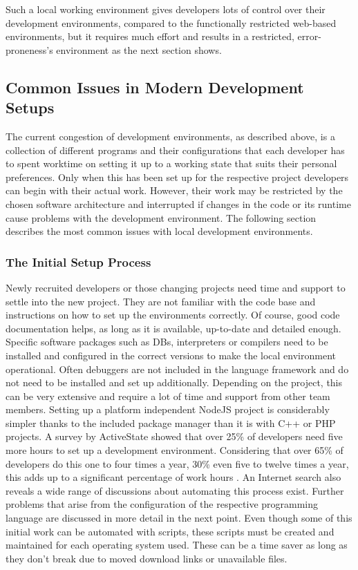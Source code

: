 \documentclass[12pt, a4paper]{article}
\begin{document}
    Such a local working environment gives developers lots of control over their development environments, compared to the functionally restricted web-based environments, but it requires much effort and results in a restricted, error-proneness's environment as the next section shows.

    \subsection{Common Issues in Modern Development Setups}
    The current congestion of development environments, as described above, is a collection of different programs and their configurations that each developer has to spent worktime on setting it up to a working state that suits their personal preferences. Only when this has been set up for the respective project developers can begin with their actual work. However, their work may be restricted by the chosen software architecture and interrupted if changes in the code or its runtime cause problems with the development environment. The following section describes the most common issues with local development environments.

        \subsubsection{The Initial Setup Process}\label{sss::initial}
        Newly recruited developers or those changing projects need time and support to settle into the new project. They are not familiar with the code base and instructions on how to set up the environments correctly. Of course, good code documentation helps, as long as it is available, up-to-date and detailed enough. Specific software packages such as \ac{DB}s, interpreters or compilers need to be installed and configured in the correct versions to make the local environment operational. Often debuggers are not included in the language framework and do not need to be installed and set up additionally. Depending on the project, this can be very extensive and require a lot of time and support from other team members. Setting up a platform independent NodeJS project is considerably simpler thanks to the included package manager  than it is with C++ or PHP projects. A survey by ActiveState showed that over 25\% of developers need five more hours to set up a development environment. Considering that over 65\% of developers do this one to four times a year, 30\% even five to twelve times a year, this adds up to a significant percentage of work hours \cite{setuppain}. An Internet search also reveals a wide range of discussions about automating this process exist. Further problems that arise from the configuration of the respective programming language are discussed in more detail in the next point. \newline
        Even though some of this initial work can be automated with scripts, these scripts must be created and maintained for each operating system used. These can be a time saver as long as they don't break due to moved download links or unavailable files.
\end{document}
